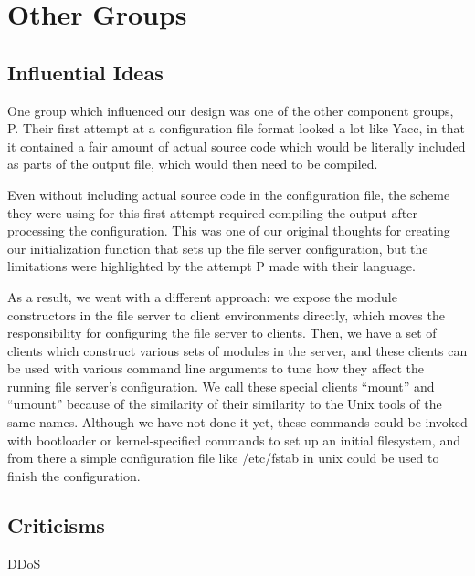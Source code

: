 \section{Other Groups}
\label{sec:groups}

\subsection{Influential Ideas}

One group which influenced our design was one of the other component groups, P.
Their first attempt at a configuration file format looked a lot like Yacc, in
that it contained a fair amount of actual source code which would be literally
included as parts of the output file, which would then need to be compiled.

Even without including actual source code in the configuration file, the scheme
they were using for this first attempt required compiling the output after
processing the configuration. This was one of our original thoughts for creating
our initialization function that sets up the file server configuration, but
the limitations were highlighted by the attempt P made with their language.

As a result, we went with a different approach: we expose the module
constructors in the file server to client environments directly, which moves the
responsibility for configuring the file server to clients. Then, we have a set
of clients which construct various sets of modules in the server, and these
clients can be used with various command line arguments to tune how they affect
the running file server's configuration. We call these special clients ``mount''
and ``umount'' because of the similarity of their similarity to the Unix tools
of the same names. Although we have not done it yet, these commands could be
invoked with bootloader or kernel-specified commands to set up an initial
filesystem, and from there a simple configuration file like /etc/fstab in unix
could be used to finish the configuration.

\subsection{Criticisms}
DDoS
